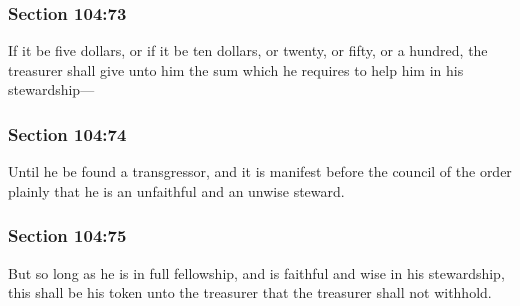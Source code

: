 	\subsubsection{Section 104:73} %
		\label{DC104-73}

		If it be five dollars, or if it be ten dollars, or twenty, or fifty, or a hundred, the treasurer shall give unto him the sum which he requires to help him in his stewardship---


	\subsubsection{Section 104:74} %
		\label{DC104-74}

		Until he be found a transgressor, and it is manifest before the council of the order plainly that he is an unfaithful and an unwise steward.


	\subsubsection{Section 104:75} %
		\label{DC104-75}

		But so long as he is in full fellowship, and is faithful and wise in his stewardship, this shall be his token unto the treasurer that the treasurer shall not withhold.


